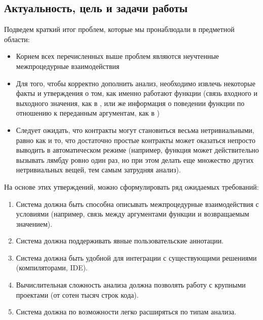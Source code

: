 \subsection{Актуальность, цель и задачи работы}

Подведем краткий итог проблем, которые мы пронаблюдали в предметной области:

\begin{itemize}
    \item Корнем всех перечисленных выше проблем являются неучтенные межпроцедурные взаимодействия
    
    \item Для того, чтобы корректно дополнить анализ, необходимо извлечь некоторые факты и утверждения о том, как именно работают функции (связь входного и выходного значения, как в , или же информация о поведении функции по отношению к переданным аргументам, как в )
    
    \item Следует ожидать, что контракты могут становиться весьма нетривиальными, равно как и то, что достаточно простые контракты может оказаться непросто выводить в автоматическом режиме (например, функция может действительно вызывать лямбду ровно один раз, но при этом делать еще множество других нетривиальных вещей, тем самым затрудняя анализ).
\end{itemize}

На основе этих утверждений, можно сформулировать ряд ожидаемых требований:

\begin{enumerate}
	\item Система должна быть способна описывать межпроцедурные взаимодействия с условиями (например, связь между аргументами функции и возвращаемым значением).
	
	\item Система должна поддерживать явные пользовательские аннотации.
	
	\item Система должна быть удобной для интеграции с существующими решениями (компиляторами, IDE).
	
	\item Вычислительная сложность анализа должна позволять работу с крупными проектами (от сотен тысяч строк кода).
	
	\item Система должна по возможности легко расширяться по типам анализа.
\end{enumerate}

